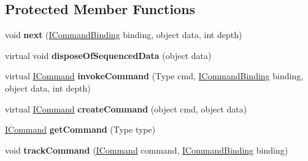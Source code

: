 \subsection*{Protected Member Functions}
\begin{DoxyCompactItemize}
\item 
\hypertarget{classstrange_1_1extensions_1_1command_1_1impl_1_1_command_binder_a31efd303e2d431a7aa6654c8598a2ae1}{void {\bfseries next} (\hyperlink{interfacestrange_1_1extensions_1_1command_1_1api_1_1_i_command_binding}{I\-Command\-Binding} binding, object data, int depth)}\label{classstrange_1_1extensions_1_1command_1_1impl_1_1_command_binder_a31efd303e2d431a7aa6654c8598a2ae1}

\item 
\hypertarget{classstrange_1_1extensions_1_1command_1_1impl_1_1_command_binder_a9037b836c71a9332fe7eb2e0fcb748e4}{virtual void {\bfseries dispose\-Of\-Sequenced\-Data} (object data)}\label{classstrange_1_1extensions_1_1command_1_1impl_1_1_command_binder_a9037b836c71a9332fe7eb2e0fcb748e4}

\item 
\hypertarget{classstrange_1_1extensions_1_1command_1_1impl_1_1_command_binder_a6ac0eaf086a6425a54492846f858703d}{virtual \hyperlink{interfacestrange_1_1extensions_1_1command_1_1api_1_1_i_command}{I\-Command} {\bfseries invoke\-Command} (Type cmd, \hyperlink{interfacestrange_1_1extensions_1_1command_1_1api_1_1_i_command_binding}{I\-Command\-Binding} binding, object data, int depth)}\label{classstrange_1_1extensions_1_1command_1_1impl_1_1_command_binder_a6ac0eaf086a6425a54492846f858703d}

\item 
\hypertarget{classstrange_1_1extensions_1_1command_1_1impl_1_1_command_binder_afcde1b363255b70ed9f84c7f90d139d4}{virtual \hyperlink{interfacestrange_1_1extensions_1_1command_1_1api_1_1_i_command}{I\-Command} {\bfseries create\-Command} (object cmd, object data)}\label{classstrange_1_1extensions_1_1command_1_1impl_1_1_command_binder_afcde1b363255b70ed9f84c7f90d139d4}

\item 
\hypertarget{classstrange_1_1extensions_1_1command_1_1impl_1_1_command_binder_a2900c118bf394b4b6138832e010c1df6}{\hyperlink{interfacestrange_1_1extensions_1_1command_1_1api_1_1_i_command}{I\-Command} {\bfseries get\-Command} (Type type)}\label{classstrange_1_1extensions_1_1command_1_1impl_1_1_command_binder_a2900c118bf394b4b6138832e010c1df6}

\item 
\hypertarget{classstrange_1_1extensions_1_1command_1_1impl_1_1_command_binder_ac72e98df4d7b5c47d4f6514fd515f4ec}{void {\bfseries track\-Command} (\hyperlink{interfacestrange_1_1extensions_1_1command_1_1api_1_1_i_command}{I\-Command} command, \hyperlink{interfacestrange_1_1extensions_1_1command_1_1api_1_1_i_command_binding}{I\-Command\-Binding} binding)}\label{classstrange_1_1extensions_1_1command_1_1impl_1_1_command_binder_ac72e98df4d7b5c47d4f6514fd515f4ec}


\end{DoxyCompactItemize}
